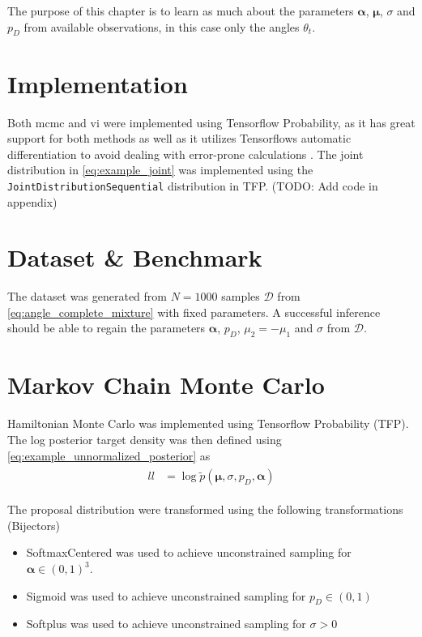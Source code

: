 The purpose of this chapter is to learn as much about the parameters $\boldsymbol{\alpha}$, $\boldsymbol{\mu}$, $\sigma$ and $p_D$ from available observations, in this case only the angles $\theta_t$. 

\section{Implementation}
Both \acrshort{mcmc} and \acrshort{vi} were implemented using Tensorflow Probability, as it has great support for both methods as well as it utilizes Tensorflows automatic differentiation to avoid dealing with error-prone calculations \cite{tensorflow2015-whitepaper}. The joint distribution in \cref{eq:example_joint} was implemented using the \texttt{JointDistributionSequential} distribution in TFP. (TODO: Add code in appendix)


\section{Dataset \& Benchmark}
The dataset was generated from $N=1000$ samples $\boldsymbol{\mathcal{D}}$ from \cref{eq:angle_complete_mixture} with fixed parameters. A successful inference should be able to regain the parameters $\boldsymbol{\alpha}$, $p_D$, $\mu_2 = -\mu_1$ and $\sigma$ from $\mathcal{D}$.

\section{Markov Chain Monte Carlo}
Hamiltonian Monte Carlo was implemented using Tensorflow Probability (TFP). The log posterior target density was then defined using \cref{eq:example_unnormalized_posterior} as 
\begin{align}\label{eq:example_ll}
\begin{split}
    ll &= \log \tilde{p}(\boldsymbol{\mu}, \sigma, p_D, \boldsymbol{\alpha})
\end{split}
\end{align}

The proposal distribution were transformed using the following transformations (Bijectors)

\begin{itemize}
\item SoftmaxCentered was used to achieve unconstrained sampling for $\boldsymbol{\alpha} \in (0, 1)^3$.
\item Sigmoid was used to achieve unconstrained sampling for $p_D \in (0, 1)$
\item Softplus was used to achieve unconstrained sampling for $\sigma > 0$
\end{itemize}

